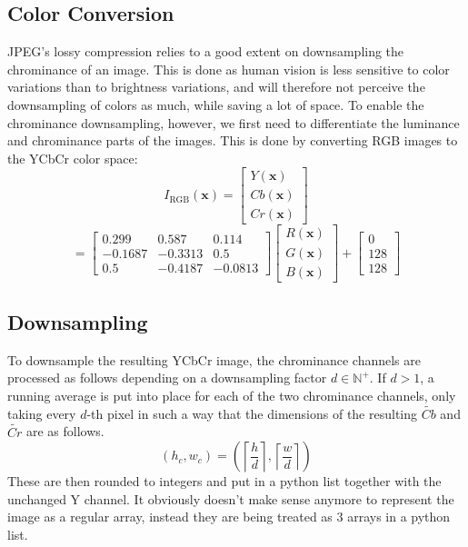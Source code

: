 \subsection{Color Conversion}
\label{sec:color}
JPEG's lossy compression relies to a good extent on downsampling the chrominance of an image. This is done as human vision is less sensitive to color variations than to brightness variations, and will therefore not perceive the downsampling of colors as much, while saving a lot of space.
To enable the chrominance downsampling, however, we first need to differentiate the luminance and chrominance parts of the images. This is done by converting RGB images to the YCbCr color space:
\begin{equation}
I_{\text{RGB}}(\bm{x}) = \begin{bmatrix} Y(\bm{x}) \\ Cb(\bm{x}) \\ Cr(\bm{x}) \end{bmatrix}
\end{equation}
\begin{equation}
= \begin{bmatrix} 0.299 & 0.587 & 0.114 \\ -0.1687 & -0.3313 & 0.5 \\ 0.5 & -0.4187 & -0.0813 \end{bmatrix} \begin{bmatrix} R(\bm{x}) \\ G(\bm{x}) \\ B(\bm{x}) \end{bmatrix} + \begin{bmatrix} 0 \\ 128 \\ 128 \end{bmatrix}
\end{equation}

\subsection{Downsampling}
To downsample the resulting YCbCr image, the chrominance channels are processed as follows depending on a downsampling factor  $d \in \mathbb{N}^+$. 
If \(d > 1\), a running average is put into place for each of the two chrominance channels, only taking every \(d\)-th pixel in such a way that the dimensions of the resulting \(\tilde{Cb}\) and \(\tilde{Cr}\) are as follows. 
\[
(h_c, w_c) = \left( \left\lceil \frac{h}{d} \right\rceil, \left\lceil \frac{w}{d} \right\rceil \right)
\]
These are then rounded to integers and put in a python list together with the unchanged Y channel. It obviously doesn't make sense anymore to represent the image as a regular array, instead they are being treated as 3 arrays in a python list.

